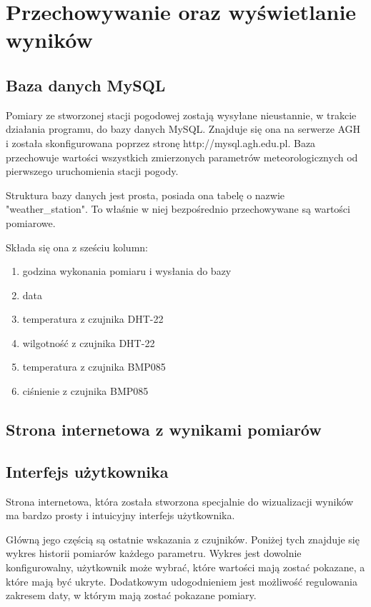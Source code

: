 \chapter{Przechowywanie oraz wyświetlanie wyników}

\section{Baza danych MySQL}
Pomiary ze stworzonej stacji pogodowej zostają wysyłane nieustannie, w trakcie działania programu, do bazy danych MySQL. Znajduje się ona na serwerze AGH i została skonfigurowana poprzez stronę http://mysql.agh.edu.pl. Baza przechowuje wartości wszystkich zmierzonych parametrów meteorologicznych od pierwszego uruchomienia stacji pogody.

Struktura bazy danych jest prosta, posiada ona tabelę o nazwie "weather\_station". To właśnie w niej bezpośrednio przechowywane są wartości pomiarowe.

Składa się ona z sześciu kolumn:
\begin{enumerate}
\item godzina wykonania pomiaru i wysłania do bazy
\item data
\item temperatura z czujnika DHT-22
\item wilgotność z czujnika DHT-22
\item temperatura z czujnika BMP085
\item ciśnienie z czujnika BMP085
\end{enumerate}

\section{Strona internetowa z wynikami pomiarów}

\section{Interfejs użytkownika}
Strona internetowa, która została stworzona specjalnie do wizualizacji wyników ma bardzo prosty i intuicyjny interfejs użytkownika.

Główną jego częścią są ostatnie wskazania z czujników. Poniżej tych znajduje się wykres historii pomiarów każdego parametru. Wykres jest dowolnie konfigurowalny, użytkownik może wybrać, które wartości mają zostać pokazane, a które mają być ukryte. Dodatkowym udogodnieniem jest możliwość regulowania zakresem daty, w którym mają zostać pokazane pomiary.